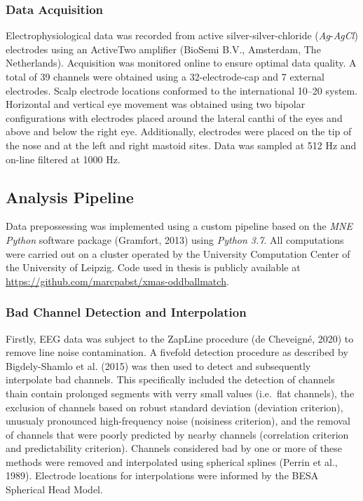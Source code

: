\documentclass[stu,a4paper,11pt,floatsintext]{apa7}
\begin{document}
\hypertarget{data-acquisition-1}{%
\subsubsection{Data Acquisition}\label{data-acquisition-1}}

Electrophysiological data was recorded from active
silver-silver-chloride (\emph{Ag}-\emph{AgCl}) electrodes using an
ActiveTwo amplifier (BioSemi B.V., Amsterdam, The Netherlands).
Acquisition was monitored online to ensure optimal data quality. A total
of 39 channels were obtained using a 32-electrode-cap and 7 external
electrodes. Scalp electrode locations conformed to the international
10--20 system. Horizontal and vertical eye movement was obtained using
two bipolar configurations with electrodes placed around the lateral
canthi of the eyes and above and below the right eye. Additionally,
electrodes were placed on the tip of the nose and at the left and right
mastoid sites. Data was sampled at 512 Hz and on-line filtered at 1000
Hz.

\hypertarget{analysis-pipeline}{%
\subsection{Analysis Pipeline}\label{analysis-pipeline}}

Data prepossessing was implemented using a custom pipeline based on the
\emph{MNE Python} software package (Gramfort, 2013) using \emph{Python
3.7}. All computations were carried out on a cluster operated by the
University Computation Center of the University of Leipzig. Code used in
thesis is publicly available at
\url{https://github.com/marcpabst/xmas-oddballmatch}.

\hypertarget{bad-channel-detection-and-interpolation}{%
\subsubsection{Bad Channel Detection and
Interpolation}\label{bad-channel-detection-and-interpolation}}

Firstly, EEG data was subject to the ZapLine procedure (de Cheveigné,
2020) to remove line noise contamination. A fivefold detection procedure
as described by Bigdely-Shamlo et al. (2015) was then used to detect and
subsequently interpolate bad channels. This specifically included the
detection of channels thain contain prolonged segments with verry small
values (i.e.~flat channels), the exclusion of channels based on robust
standard deviation (deviation criterion), unusualy pronounced
high-frequency noise (noisiness criterion), and the removal of channels
that were poorly predicted by nearby channels (correlation criterion and
predictability criterion). Channels considered bad by one or more of
these methods were removed and interpolated using spherical splines
(Perrin et al., 1989). Electrode locations for interpolations were
informed by the BESA Spherical Head Model.
\end{document}
